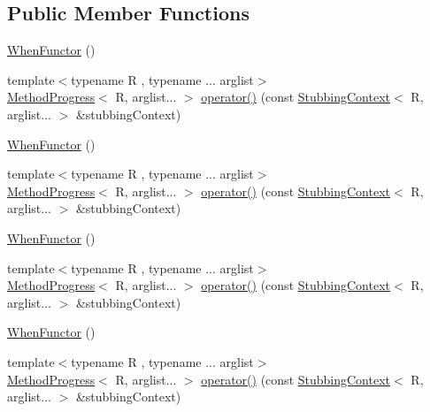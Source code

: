 \subsection*{Public Member Functions}
\begin{DoxyCompactItemize}
\item 
\mbox{\hyperlink{classfakeit_1_1WhenFunctor_adbe70f65cae3cf3426dbc2204c13eff7}{When\+Functor}} ()
\item 
{\footnotesize template$<$typename R , typename ... arglist$>$ }\\\mbox{\hyperlink{structfakeit_1_1WhenFunctor_1_1MethodProgress}{Method\+Progress}}$<$ R, arglist... $>$ \mbox{\hyperlink{classfakeit_1_1WhenFunctor_ad93479462c8651e779ab83d2699d6a0c}{operator()}} (const \mbox{\hyperlink{structfakeit_1_1StubbingContext}{Stubbing\+Context}}$<$ R, arglist... $>$ \&stubbing\+Context)
\item 
\mbox{\hyperlink{classfakeit_1_1WhenFunctor_adbe70f65cae3cf3426dbc2204c13eff7}{When\+Functor}} ()
\item 
{\footnotesize template$<$typename R , typename ... arglist$>$ }\\\mbox{\hyperlink{structfakeit_1_1WhenFunctor_1_1MethodProgress}{Method\+Progress}}$<$ R, arglist... $>$ \mbox{\hyperlink{classfakeit_1_1WhenFunctor_ad93479462c8651e779ab83d2699d6a0c}{operator()}} (const \mbox{\hyperlink{structfakeit_1_1StubbingContext}{Stubbing\+Context}}$<$ R, arglist... $>$ \&stubbing\+Context)
\item 
\mbox{\hyperlink{classfakeit_1_1WhenFunctor_adbe70f65cae3cf3426dbc2204c13eff7}{When\+Functor}} ()
\item 
{\footnotesize template$<$typename R , typename ... arglist$>$ }\\\mbox{\hyperlink{structfakeit_1_1WhenFunctor_1_1MethodProgress}{Method\+Progress}}$<$ R, arglist... $>$ \mbox{\hyperlink{classfakeit_1_1WhenFunctor_ad93479462c8651e779ab83d2699d6a0c}{operator()}} (const \mbox{\hyperlink{structfakeit_1_1StubbingContext}{Stubbing\+Context}}$<$ R, arglist... $>$ \&stubbing\+Context)
\item 
\mbox{\hyperlink{classfakeit_1_1WhenFunctor_adbe70f65cae3cf3426dbc2204c13eff7}{When\+Functor}} ()
\item 
{\footnotesize template$<$typename R , typename ... arglist$>$ }\\\mbox{\hyperlink{structfakeit_1_1WhenFunctor_1_1MethodProgress}{Method\+Progress}}$<$ R, arglist... $>$ \mbox{\hyperlink{classfakeit_1_1WhenFunctor_ad93479462c8651e779ab83d2699d6a0c}{operator()}} (const \mbox{\hyperlink{structfakeit_1_1StubbingContext}{Stubbing\+Context}}$<$ R, arglist... $>$ \&stubbing\+Context)

\end{DoxyCompactItemize}
